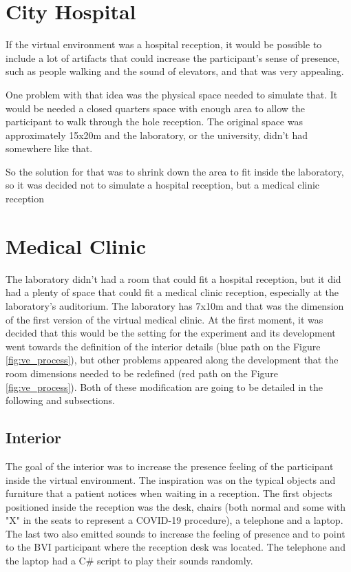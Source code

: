 \section{City Hospital}

    If the virtual environment was a hospital reception, it would be possible to include a lot of artifacts that could increase the participant's sense of presence, such as people walking and the sound of elevators, and that was very appealing.
    
    One problem with that idea was the physical space needed to simulate that. It would be needed a closed quarters space with enough area to allow the participant to walk through the hole reception. The original space was approximately 15x20m and the laboratory, or the university, didn't had somewhere like that.
    
    So the solution for that was to shrink down the area to fit inside the laboratory, so it was decided not to simulate a hospital reception, but a medical clinic reception

\section{Medical Clinic}

    The laboratory didn't had a room that could fit a hospital reception, but it did had a plenty of space that could fit a medical clinic reception, especially at the laboratory's auditorium. The laboratory has 7x10m and that was the dimension of the first version of the virtual medical clinic. At the first moment, it was decided that this would be the setting for the experiment and its development went towards the definition of the interior details (blue path on the Figure \ref{fig:ve_process}), but other problems appeared along the development that the room dimensions needed to be redefined (red path on the Figure \ref{fig:ve_process}). Both of these modification are going to be detailed in the following  and  subsections.
    
    \subsection{Interior}
    \label{subsec:interior}
    
        The goal of the interior was to increase the presence feeling of the participant inside the virtual environment. The inspiration was on the typical objects and furniture that a patient notices when waiting in a reception. The first objects positioned inside the reception was the desk, chairs (both normal and some with "X" in the seats to represent a COVID-19 procedure), a telephone and a laptop. The last two also emitted sounds to increase the feeling of presence and to point to the BVI participant where the reception desk was located. The telephone and the laptop had a C\# script to play their sounds randomly.
        

